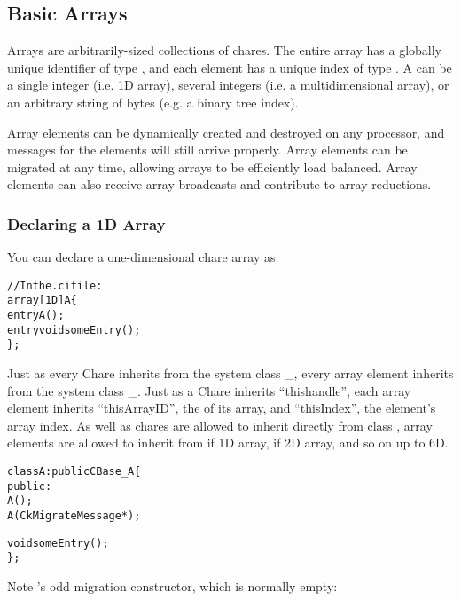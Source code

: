 \subsection{Basic Arrays}

\label{basic arrays}

Arrays  are arbitrarily-sized collections of chares.  The
entire array has a globally unique identifier of type , and
each element has a unique index of type .  A 
can be a single integer (i.e. 1D array), several integers (i.e. a
multidimensional array), or an arbitrary string of bytes (e.g. a binary tree
index).

Array elements can be dynamically created and destroyed on any processor,
and messages for the elements will still arrive properly.
Array elements can be migrated at any time, allowing arrays to be efficiently
load balanced.  Array elements can also receive array broadcasts and
contribute to array reductions.

\subsubsection{Declaring a 1D Array}

You can declare a one-dimensional chare array
as:

\begin{alltt}
//In the .ci file:
array [1D] A \{
  entry A();
  entry void someEntry();
\};
\end{alltt}

Just as every Chare inherits from the system class \_, every 
array element inherits from the system class \_.
Just as a Chare inherits ``thishandle'', each
array element inherits ``thisArrayID'', the  of its array,
and ``thisIndex'', the element's array index.
As well as chares are allowed to inherit directly from class ,
array elements are allowed to inherit from  if 1D array,
 if 2D array, and so on up to 6D.

\begin{alltt}
class A : public CBase\_A \{
  public:
    A();
    A(CkMigrateMessage *);

    void someEntry();
\};
\end{alltt}

Note 's odd migration constructor, which is normally empty:

